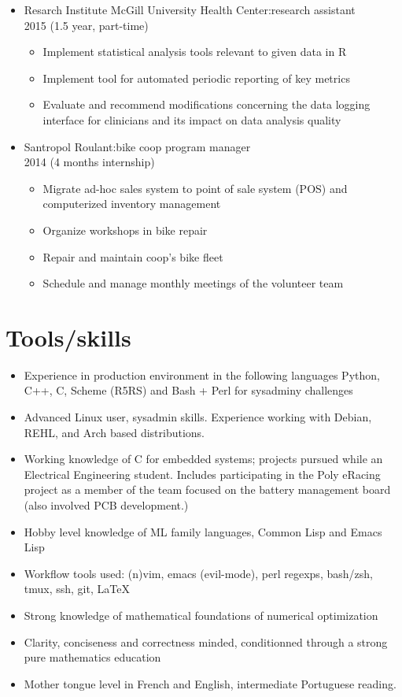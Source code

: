 \documentclass{article}
\begin{document}
\begin{itemize}
  \item Resarch Institute McGill University Health Center:\@ research assistant\\ 2015 (1.5 year, part-time)
    \begin{itemize}
      \item Implement statistical analysis tools relevant to given data in R
      \item Implement tool for automated periodic reporting of key metrics
      \item Evaluate and recommend modifications concerning the data logging
        interface for clinicians and its impact on data analysis quality
    \end{itemize}

  \item Santropol Roulant:\@ bike coop program manager\\ 2014 (4 months internship)
    \begin{itemize}
      \item Migrate ad-hoc sales system to point of sale system (POS) and computerized inventory management
      \item Organize workshops in bike repair
      \item Repair and maintain coop's bike fleet
      \item Schedule and manage monthly meetings of the volunteer team
    \end{itemize}

\end{itemize}

\section*{Tools/skills}
\begin{itemize}
  \item Experience in production environment in the following languages Python, C++, C,  Scheme (R5RS) and Bash + Perl for sysadminy challenges
  \item Advanced Linux user, sysadmin skills.  Experience working with Debian, REHL, and Arch based distributions.
  \item Working knowledge of C for embedded systems; projects pursued while an Electrical Engineering student. Includes participating in the Poly eRacing project as a member of the team focused on the battery management board (also involved PCB development.)
  \item Hobby level knowledge of ML family languages, Common Lisp and Emacs Lisp 
  \item Workflow tools used: (n)vim, emacs (evil-mode), perl regexps, bash/zsh, tmux, ssh, git, \LaTeX
  \item Strong knowledge of mathematical foundations of numerical optimization
  \item Clarity, conciseness and correctness minded, conditionned through a strong pure mathematics education
  \item Mother tongue level in French and English, intermediate Portuguese reading.
\end{itemize}
\end{document}
